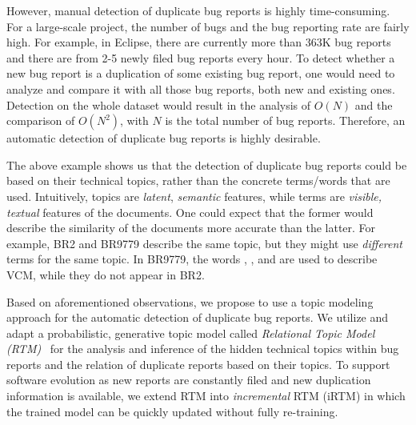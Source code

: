 However, manual detection of duplicate bug reports is highly
time-consuming. For a large-scale project, the number of bugs and the
bug reporting rate are fairly high. For example, in Eclipse, there are
currently more than 363K bug reports and there are from 2-5 newly
filed bug reports every hour. To detect whether a new bug report is a
duplication of some existing bug report, one would need to analyze and
compare it with all those bug reports, both new and existing
ones. Detection on the whole dataset would result in the analysis of
$O(N)$ and the comparison of $O(N^2)$, with $N$ is the total number of
bug reports. Therefore, an automatic detection of duplicate bug
reports is highly desirable.

The above example shows us that the detection of duplicate bug reports
could be based on their technical topics, rather than the concrete
terms/words that are used. Intuitively, topics are \emph{latent}, {\em
semantic} features, while terms are \emph{visible, textual} features
of the documents. One could expect that the former would describe the
similarity of the documents more accurate than the latter. For
example, BR2 and BR9779 describe the same topic, but they might use
\emph{different} terms for the same topic. In BR9779, the words
, , and  are used to
describe VCM, while they do not appear in BR2.



Based on aforementioned observations, we propose to use a topic
modeling approach for the automatic detection of duplicate bug
reports. We utilize and adapt a probabilistic, generative topic model
called {\em Relational Topic Model (RTM)}~\cite{RTM} for the analysis
and inference of the hidden technical topics within bug reports and
the relation of duplicate reports based on their topics. To support
software evolution as new reports are constantly filed and new
duplication information is available, we extend RTM into {\em
incremental} RTM (iRTM) in which the trained model can be quickly
updated without fully re-training.


